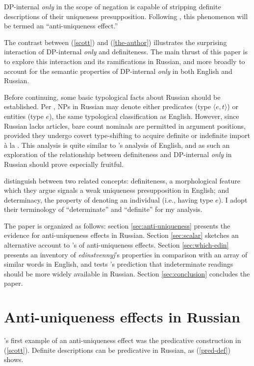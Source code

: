 \documentclass{article}
\begin{document}
DP-internal \textit{only} in the scope of negation is capable of stripping definite descriptions of their uniqueness presupposition. Following \citeauthor{cb2015}, this phenomenon will be termed an ``anti-uniqueness effect.''

The contrast between (\ref{scott}) and (\ref{the-author}) illustrates the surprising interaction of DP-internal \textit{only} and definiteness. The main thrust of this paper is to explore this interaction and its ramifications in Russian, and more broadly to account for the semantic properties of DP-internal \textit{only} in both English and Russian.

Before continuing, some basic typological facts about Russian should be established. Per \citet{chierchia98}, NPs in Russian may denote either predicates (type $\langle e, t \rangle$) or entities (type $e$), the same typological classification as English. However, since Russian lacks articles, bare count nominals are permitted in argument positions, provided they undergo covert type-shifting to acquire definite or indefinite import \`{a} la \citet{partee86}. This analysis is quite similar to \citeauthor{cb2015}'s analysis of English, and as such an exploration of the relationship between definiteness and DP-internal \textit{only} in Russian should prove especially fruitful.

\citeauthor{cb2015} distinguish between two related concepts: definiteness, a morphological feature which they argue signals a weak uniqueness presupposition in English; and determinacy, the property of denoting an individual (i.e., having type $e$). I adopt their terminology of ``determinate'' and ``definite'' for my analysis.

The paper is organized as follows: section \ref{sec:anti-uniqueness} presents the evidence for anti-uniqueness effects in Russian. Section \ref{sec:scalar} sketches an alternative account to \citeauthor{cb2015}'s of anti-uniqueness effects. Section \ref{sec:which-edin} presents an inventory of \textit{edinstvennyj}'s properties in comparison with an array of similar words in English, and tests \citeauthor{cb2015}'s prediction that indeterminate readings should be more widely available in Russian. Section \ref{sec:conclusion} concludes the paper.




\section{Anti-uniqueness effects in Russian \label{sec:anti-uniqueness}}
\citeauthor{cb2015}'s first example of an anti-uniqueness effect was the predicative construction in (\ref{scott}). Definite descriptions can be predicative in Russian, as (\ref{pred-def}) shows.
\end{document}
